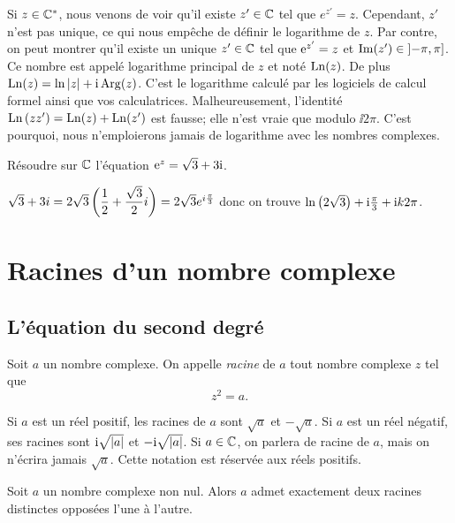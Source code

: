 \documentclass{magnolia}
\begin{document}
\begin{remarqueUnique}
\remarque Si $z\in\mathbb{C}^*$, nous venons de voir qu'il existe $z'\in\mathbb{C}$ tel que
  $e^{z'}=z$. Cependant, $z'$ n'est pas unique, ce qui nous empêche de définir
  le logarithme de $z$. Par contre, on peut montrer qu'il existe un unique $z'\in\mathbb{C}$ tel que ${\rm e}^{z'}=z$ et
  $\mathop{\rm Im}(z')\in\left]-\pi,\pi\right]$. Ce nombre est appelé logarithme
  principal de $z$ et noté $\operatorname{Ln}(z)$. De plus $\operatorname{Ln}(z)=\ln\left|z\right|+{\rm i}\operatorname{Arg}(z)$. C'est le logarithme calculé par les logiciels de calcul formel ainsi que vos calculatrices. Malheureusement, l'identité $\operatorname{Ln}\left(z z'\right)=\operatorname{Ln}(z)+\operatorname{Ln}(z')$ est fausse;
  elle n'est vraie que modulo $\ii2\pi$. C'est pourquoi, nous n'emploierons
  jamais de logarithme avec les nombres complexes.
\end{remarqueUnique}

\begin{exoUnique}
\exo Résoudre sur $\mathbb{C}$ l'équation ${\rm e}^z=\sqrt{3}+3{\rm i}$.
  \begin{sol}
  $\sqrt{3}+3i=2\sqrt{3}\left(\dfrac{1}{2}+\dfrac{\sqrt 3}{2}i\right)=2\sqrt{3}e^{i\frac{\pi}{3}}$ donc on trouve $\ln\left(2\sqrt{3}\right)+{\rm i}\frac{\pi}{3}+{\rm i} k2\pi$.
  \end{sol}
\end{exoUnique}

\section{Racines d'un nombre complexe}
\subsection{L'équation du second degré}

\begin{definition}[utile=-3]
Soit $a$ un nombre complexe. On appelle \emph{racine} de $a$ tout nombre complexe $z$
tel que
\[z^2=a.\]
\end{definition}

\begin{remarques}
\remarque Si $a$ est un réel positif, les racines de $a$ sont $\sqrt{a}$ et $-\sqrt{a}$.
  Si $a$ est un réel négatif, ses racines sont ${\rm i}\sqrt{\left|a\right|}$ et
  $-{\rm i}\sqrt{\left|a\right|}$.
\remarque Si $a\in\mathbb{C}$, on parlera de racine de $a$, mais on n'écrira jamais $\sqrt{a}$. Cette notation est réservée aux réels positifs.
\end{remarques}

\begin{proposition}[utile=-3]
Soit $a$ un nombre complexe non nul. Alors $a$ admet exactement deux
racines distinctes opposées l'une à l'autre.
\end{proposition}
\end{document}
